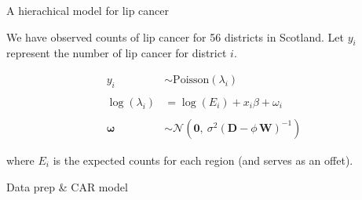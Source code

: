 \documentclass[11pt,ignorenonframetext,]{beamer}
\newenvironment{Shaded}{}{}
\newcommand{\KeywordTok}[1]{\textcolor[rgb]{0.00,0.44,0.13}{\textbf{#1}}}
\newcommand{\NormalTok}[1]{#1}
\newcommand{\OperatorTok}[1]{\textcolor[rgb]{0.40,0.40,0.40}{#1}}
\newcommand{\StringTok}[1]{\textcolor[rgb]{0.25,0.44,0.63}{#1}}
\let\oldShaded\Shaded
\let\endoldShaded\endShaded
\renewenvironment{Shaded}{\footnotesize\begin{spacing}{0.9}\oldShaded}{\endoldShaded\end{spacing}}
\let\oldverbatim\verbatim
\let\endoldverbatim\endverbatim
\newcommand{\scriptoutput}{
  \renewenvironment{Shaded}{\scriptsize\begin{spacing}{0.9}\oldShaded}{\endoldShaded\end{spacing}}
  \renewenvironment{verbatim}{\scriptsize\begin{spacing}{0.9}\oldverbatim}{\endoldverbatim\end{spacing}}
}
\begin{document}
\begin{frame}[t]{A hierachical model for lip cancer}
\protect\hypertarget{a-hierachical-model-for-lip-cancer}{}

We have observed counts of lip cancer for 56 districts in Scotland. Let
\(y_i\) represent the number of lip cancer for district \(i\).

\[\begin{aligned}
y_i &\sim \text{Poisson}(\lambda_i) \\
\\
\log(\lambda_i) &= \log(E_i) + x_i \beta + \omega_i \\
\\
\symbf{\omega} &\sim \mathcal{N}(\symbf{0},~\sigma^2(\symbf{D}-\phi\,\symbf{W})^{-1})
\end{aligned}\]

where \(E_i\) is the expected counts for each region (and serves as an
offet).

\end{frame}

\begin{frame}[fragile]{Data prep \& CAR model}
\protect\hypertarget{data-prep-car-model}{}

\scriptoutput

\begin{Shaded}
\end{Shaded}

\begin{Shaded}
\end{Shaded}

\end{frame}
\end{document}
